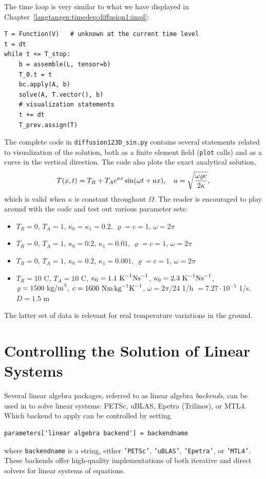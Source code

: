 The time loop is very similar to what we have displayed in
Chapter~\ref{langtangen:timedep:diffusion1:impl}:
\begin{Verbatim}[fontsize=\fontsize{10pt}{10pt},tabsize=8,baselinestretch=1.05,
fontfamily=tt,xleftmargin=7mm]
T = Function(V)   # unknown at the current time level
t = dt
while t <= T_stop:
    b = assemble(L, tensor=b)
    T_0.t = t
    bc.apply(A, b)
    solve(A, T.vector(), b)
    # visualization statements
    t += dt
    T_prev.assign(T)
\end{Verbatim}
\noindent
The complete code in {\fontsize{12pt}{12pt}\verb!diffusion123D_sin.py!} contains several
statements related to visualization of the solution, both as a
finite element field ({\fontsize{12pt}{12pt}\texttt{plot}} calls) and as a curve in the
vertical direction. The code also plots the exact analytical solution,
\[
T(x,t) = T_R + T_Ae^{ax}\sin (\omega t + ax),\quad a =\sqrt{\omega\varrho c\over 2\kappa},
\]
which is valid when $\kappa$ is constant throughout $\Omega$.
The reader is encouraged
to play around with the code and test out various parameter sets:
\begin{itemize}
\item $T_R=0$, $T_A=1$, $\kappa_0 = \kappa_1=0.2$, $\varrho = c = 1$, $\omega = 2\pi$
\item $T_R=0$, $T_A=1$, $\kappa_0=0.2$, $\kappa_1=0.01$, $\varrho = c = 1$, $\omega = 2\pi$
\item $T_R=0$, $T_A=1$, $\kappa_0=0.2$, $\kappa_1=0.001$, $\varrho = c = 1$, $\omega = 2\pi$
\item $T_R=10$ C, $T_A=10$ C, $\kappa_0= 1.1 \hbox{ K}^{-1}\hbox{Ns}^{-1}$,
$\kappa_0= 2.3 \hbox{ K}^{-1}\hbox{Ns}^{-1}$,
$\varrho = 1500\hbox{ kg/m}^3$,
$c = 1600\hbox{ Nm\,kg}^{-1}\hbox{K}^{-1}$,
$\omega = 2\pi/24$ 1/h  $= 7.27\cdot 10^{-5}$ 1/s, $D=1.5$ m
\end{itemize}
The latter set of data is relevant for real temperature variations in the
ground.


\section{Controlling the Solution of Linear Systems}
\label{langtangen:linsys}

Several linear algebra packages, referred to as
linear algebra \emph{backends}, can be used in \fenics{} to solve
linear systems:
PETSc, uBLAS, Epetra (Trilinos), or MTL4.
Which backend to apply can be controlled by setting
\begin{Verbatim}[fontsize=\fontsize{10pt}{10pt},tabsize=8,baselinestretch=1.05,
fontfamily=tt,xleftmargin=7mm]
parameters['linear algebra backend'] = backendname
\end{Verbatim}
\noindent
where {\fontsize{12pt}{12pt}\texttt{backendname}} is a string, either {\fontsize{12pt}{12pt}\texttt{'PETSc'}},
{\fontsize{12pt}{12pt}\texttt{'uBLAS'}}, {\fontsize{12pt}{12pt}\texttt{'Epetra'}}, or {\fontsize{12pt}{12pt}\texttt{'MTL4'}}.
These backends offer high-quality implementations of both iterative
and direct solvers for linear systems of equations.

